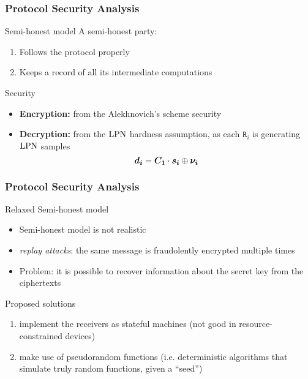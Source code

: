 \begin{frame}
 \frametitle{Protocol Security Analysis }

  \begin{block}{Semi-honest model}
    A semi-honest party:
    \begin{enumerate}
      \item Follows the protocol properly
      \item Keeps a record of all its intermediate computations
    \end{enumerate}
  \end{block}

  \begin{block}{Security}
  \begin{itemize}
    \item<2-> \textbf{Encryption:} from the Alekhnovich's scheme security
    \item<3-> \textbf{Decryption:} from the $\mathrm{LPN}$ hardness assumption, as each $\mathtt{R}_i$ is generating $\mathrm{LPN}$ samples
    \[
     \boldsymbol{d_i} = \boldsymbol{C_1} \cdot \boldsymbol{s_i} \mathbin{\oplus} \boldsymbol{\nu_{i}} 
    \]

  \end{itemize}
  \end{block}
  
\end{frame}

\begin{frame}
 \frametitle{Protocol Security Analysis }

 \begin{block}{Relaxed Semi-honest model}
   \begin{itemize}
    \item<1-> Semi-honest model is not realistic 
    \item<2-> \emph{replay attacks}: the same message is fraudolently encrypted multiple times
    \item<3-> \alert{Problem:} it is possible to recover information about the secret key from the ciphertexts\\
   \end{itemize}
  \end{block}

 \begin{block}{Proposed solutions}
    \begin{enumerate}
     \item<5-> implement the receivers as \alert{stateful} machines (not good in resource-constrained devices)
     \item<6-> make use of \alert{pseudorandom functions} (i.e. deterministic algorithms that simulate truly random functions, given a ``seed'')
    \end{enumerate}
 \end{block}
 
\end{frame}


